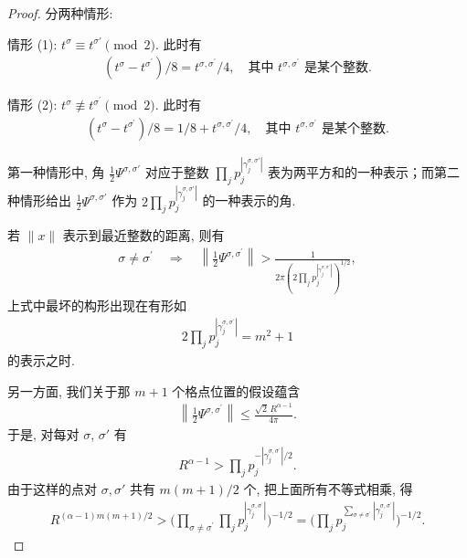 \begin{proof}
分两种情形:

情形 (1): $t^{\sigma} \equiv t^{\sigma'} \pmod{2}$. 此时有
\begin{align*}
  (t^{\sigma}-t^{\sigma^{\prime}})/8=t^{\sigma,\sigma^{\prime}}/4,\quad
  \text{其中 } t^{\sigma,\sigma^{\prime}} \text{ 是某个整数}.
\end{align*}

情形 (2): $t^{\sigma} \not\equiv t^{\sigma^{\prime}} \pmod{2}$. 此时有
\begin{align*}
  (t^{\sigma}-t^{\sigma^{\prime}})/8=1/8+t^{\sigma,\sigma^{\prime}}/4,\quad
  \text{其中 } t^{\sigma,\sigma^{\prime}} \text{ 是某个整数}.
\end{align*}

第一种情形中, 角 $\frac{1}{2}\Psi^{\sigma,\sigma'}$ 对应于整数 $\prod_{j} p_{j}^{|\gamma_{j}^{\sigma,\sigma'}|}$ 表为两平方和的一种表示；而第二种情形给出 $\frac{1}{2}\Psi^{\sigma,\sigma'}$ 作为 $2\prod_{j} p_{j}^{|\gamma_{j}^{\sigma,\sigma'}|}$ 的一种表示的角.

若 $\|x\|$ 表示到最近整数的距离, 则有
\begin{align*}
  \sigma\neq\sigma^{\prime}
  \quad\Longrightarrow\quad
  \left\|\frac{1}{2}\Psi^{\sigma,\sigma^{\prime}}\right\|
  >\frac{1}{2\pi\left(2\prod_{j}p_{j}^{|\gamma_{j}^{\sigma,\sigma^{\prime}}|}\right)^{1/2}},
\end{align*}
上式中最坏的构形出现在有形如
\begin{align*}
  2\prod_{j}p_{j}^{|\gamma_{j}^{\sigma,\sigma^{\prime}}|}=m^{2}+1
\end{align*}
的表示之时.

另一方面, 我们关于那 $m+1$ 个格点位置的假设蕴含
\begin{align*}
  \left\|\frac{1}{2}\Psi^{\sigma,\sigma^{\prime}}\right\|\leq\frac{\sqrt{2}\,R^{\alpha-1}}{4\pi}.
\end{align*}
于是, 对每对 $\sigma$, $\sigma'$ 有
\begin{align*}
  R^{\alpha-1}>\prod_{j}p_{j}^{-|\gamma_{j}^{\sigma,\sigma^{\prime}}|/2}.
\end{align*}
由于这样的点对 $\sigma, \sigma'$ 共有 $m(m+1)/2$ 个, 把上面所有不等式相乘, 得
\begin{align*}
  R^{(\alpha-1)m(m+1)/2}
  >\Big(\prod_{\sigma\neq\sigma^{\prime}}\prod_{j}p_{j}^{|\gamma_{j}^{\sigma,\sigma^{\prime}}|}\Big)^{-1/2}
  =\Big(\prod_{j}p_{j}^{\sum_{\sigma\neq\sigma^{\prime}}|\gamma_{j}^{\sigma,\sigma^{\prime}}|}\Big)^{-1/2}.
\end{align*}


\end{proof}
